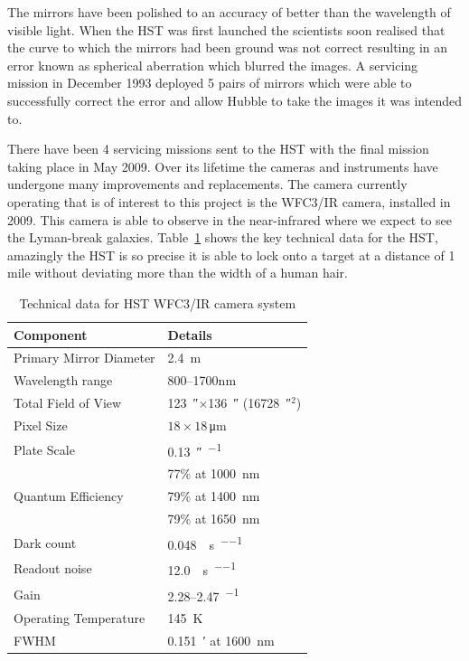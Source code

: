 		The mirrors have been polished to an accuracy of better than the wavelength of visible light. When the HST was first launched the scientists soon realised that the curve to which the mirrors had been ground was not correct resulting in an error known as spherical aberration which blurred the images. A servicing mission in December 1993 deployed 5 pairs of mirrors which were able to successfully correct the error and allow Hubble to take the images it was intended to\cite{ESA_1}.

		There have been 4 servicing missions sent to the HST with the final mission taking place in May 2009. Over its lifetime the cameras and instruments have undergone many improvements and replacements. The camera currently operating that is of interest to this project is the WFC3/IR camera, installed in 2009. This camera is able to observe in the near-infrared where we expect to see the Lyman-break galaxies. Table~\ref{tab:HST_technical} shows the key technical data for the HST, amazingly the HST is so precise it is able to lock onto a target at a distance of 1 mile without deviating more than the width of a human hair.
		\begin{table}[!htbp]
			\begin{center}
				\begin{tabular}{l|l}
					Component	& 	Details \\
					\hline\hline
					Primary Mirror Diameter & \SI{2.4}{\metre} \\ \hline
					Wavelength range & 800--1700\si{\nano\metre} \\ \hline
					Total Field of View & \SI{123}{\arcsecond}$\times$\SI{136}{\arcsecond} (\SI{16728}{\arcsecond}$^2$) \\ \hline
					Pixel Size & $18\times18$\,\si{\micro\metre} \\ \hline
					Plate Scale & \SI{0.13}{\arcsecond\per\pixel} \\ \hline
					\multirow{3}{*}{Quantum Efficiency} & 77\% at \SI{1000}{\nano\metre}\\
					 & 79\% at \SI{1400}{\nano\metre}\\
					 & 79\% at \SI{1650}{\nano\metre}\\ \hline
					Dark count &  \SI{0.048}{\electron\per\second\per\pixel} \\ \hline
					Readout noise & \SI{12.0}{\electron\per\second\per\pixel} \\ \hline
					Gain & 2.28--2.47\si{\electron\per\ADU} \\ \hline
					Operating Temperature & \SI{145}{\kelvin} \\ \hline
					FWHM & \SI{0.151}{\arcminute} at \SI{1600}{\nano\metre}
				\end{tabular}
			\end{center}
			\caption{Technical data for HST WFC3/IR camera system\cite{WFC3_IHB}}
		\label{tab:HST_technical}
		\end{table}

